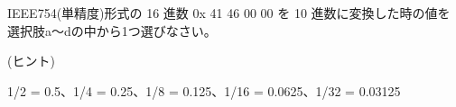 IEEE754(単精度)形式の 16 進数 0x 41 46 00 00 を 10 進数に変換した時の値を選択肢a〜dの中から1つ選びなさい。

(ヒント)

1/2 = 0.5、1/4 = 0.25、1/8 = 0.125、1/16 = 0.0625、1/32 = 0.03125
